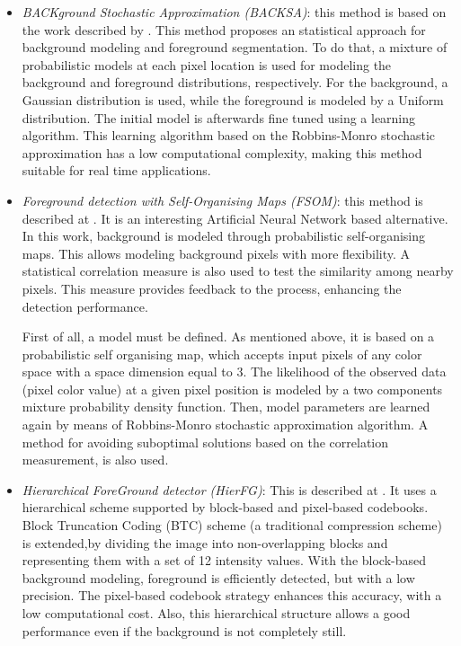 \begin{itemize}
\item \textit{BACKground Stochastic Approximation (BACKSA)}: this method is based on the work described by 
\cite{lopez2011stochastic}. This method proposes an statistical approach for background modeling and foreground 
segmentation. To do that, a mixture of probabilistic models at each pixel location is used for modeling the background and 
foreground distributions, respectively. For the background, a Gaussian distribution is used, while the foreground is 
modeled by a Uniform distribution. The initial model is afterwards fine tuned using a learning algorithm. This 
learning algorithm based on the Robbins-Monro stochastic approximation has a low computational complexity, making this method suitable for real time applications.
\item \textit{Foreground detection with Self-Organising Maps (FSOM)}: this method is described at 
\cite{lopez2011foreground}. It is an interesting Artificial Neural Network based alternative. In this 
work, background is modeled through probabilistic self-organising maps. This allows modeling background pixels with 
more flexibility. A statistical correlation measure is also used to test the similarity among nearby pixels. This 
measure provides feedback to the process, enhancing the detection performance.

First of all, a model must be defined. As mentioned above, it is based on a probabilistic self organising map, which 
accepts input pixels of any color space with a space dimension equal to 3. The likelihood of the observed data (pixel 
color value) at a given pixel position is modeled by a two components mixture probability density function.
Then, model parameters are learned again by means of Robbins-Monro stochastic approximation algorithm. A method for avoiding 
suboptimal solutions based on the correlation measurement, is also used.
\item \textit{Hierarchical ForeGround detector (HierFG)}: This is described at \cite{guo2011hierarchical}. It uses a 
hierarchical scheme supported by block-based and pixel-based codebooks. Block Truncation Coding (BTC) scheme (a 
traditional compression scheme) is extended,by dividing the image into non-overlapping blocks and representing them with 
a set of 12 intensity values. With the block-based background modeling, foreground is efficiently detected, but with a 
low precision. The pixel-based codebook strategy enhances this accuracy, with a low computational cost. Also, 
this hierarchical structure allows a good performance even if the background is not completely still.


\end{itemize}

